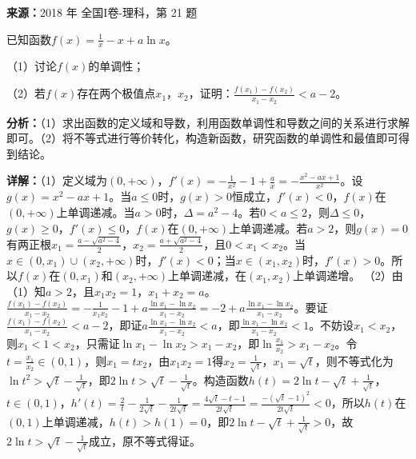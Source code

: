 \begin{question}[points=12]
\textbf{来源：}2018 年 全国I卷-理科，第 21 题\par
已知函数$f(x)=\frac{1}{x}-x+a\ln x$。

（1）讨论$f(x)$的单调性；

（2）若$f(x)$存在两个极值点$x_1$，$x_2$，证明：$\frac{f(x_1)-f(x_2)}{x_1-x_2}<a-2$。
\begin{solution}

\textbf{分析：}（1）求出函数的定义域和导数，利用函数单调性和导数之间的关系进行求解即可。（2）将不等式进行等价转化，构造新函数，研究函数的单调性和最值即可得到结论。

\textbf{详解：}（1）定义域为$(0,+\infty)$，$f'(x)=-\frac{1}{x^2}-1+\frac{a}{x}=-\frac{x^2-ax+1}{x^2}$。设$g(x)=x^2-ax+1$。当$a\leq0$时，$g(x)>0$恒成立，$f'(x)<0$，$f(x)$在$(0,+\infty)$上单调递减。当$a>0$时，$\Delta=a^2-4$。若$0<a\leq2$，则$\Delta\leq0$，$g(x)\geq0$，$f'(x)\leq0$，$f(x)$在$(0,+\infty)$上单调递减。若$a>2$，则$g(x)=0$有两正根$x_1=\frac{a-\sqrt{a^2-4}}{2}$，$x_2=\frac{a+\sqrt{a^2-4}}{2}$，且$0<x_1<x_2$。当$x\in(0,x_1)\cup(x_2,+\infty)$时，$f'(x)<0$；当$x\in(x_1,x_2)$时，$f'(x)>0$。所以$f(x)$在$(0,x_1)$和$(x_2,+\infty)$上单调递减，在$(x_1,x_2)$上单调递增。
（2）由（1）知$a>2$，且$x_1x_2=1$，$x_1+x_2=a$。$\frac{f(x_1)-f(x_2)}{x_1-x_2}=-\frac{1}{x_1x_2}-1+a\frac{\ln x_1-\ln x_2}{x_1-x_2}=-2+a\frac{\ln x_1-\ln x_2}{x_1-x_2}$。要证$\frac{f(x_1)-f(x_2)}{x_1-x_2}<a-2$，即证$a\frac{\ln x_1-\ln x_2}{x_1-x_2}<a$，即$\frac{\ln x_1-\ln x_2}{x_1-x_2}<1$。不妨设$x_1<x_2$，则$x_1<1<x_2$，只需证$\ln x_1-\ln x_2>x_1-x_2$，即$\ln\frac{x_1}{x_2}>x_1-x_2$。令$t=\frac{x_1}{x_2}\in(0,1)$，则$x_1=tx_2$，由$x_1x_2=1$得$x_2=\frac{1}{\sqrt{t}}$，$x_1=\sqrt{t}$，则不等式化为$\ln t^2>\sqrt{t}-\frac{1}{\sqrt{t}}$，即$2\ln t>\sqrt{t}-\frac{1}{\sqrt{t}}$。构造函数$h(t)=2\ln t-\sqrt{t}+\frac{1}{\sqrt{t}}$，$t\in(0,1)$，$h'(t)=\frac{2}{t}-\frac{1}{2\sqrt{t}}-\frac{1}{2t\sqrt{t}}=\frac{4\sqrt{t}-t-1}{2t\sqrt{t}}=\frac{-(\sqrt{t}-1)^2}{2t\sqrt{t}}<0$，所以$h(t)$在$(0,1)$上单调递减，$h(t)>h(1)=0$，即$2\ln t-\sqrt{t}+\frac{1}{\sqrt{t}}>0$，故$2\ln t>\sqrt{t}-\frac{1}{\sqrt{t}}$成立，原不等式得证。
\end{solution}
\end{question}

